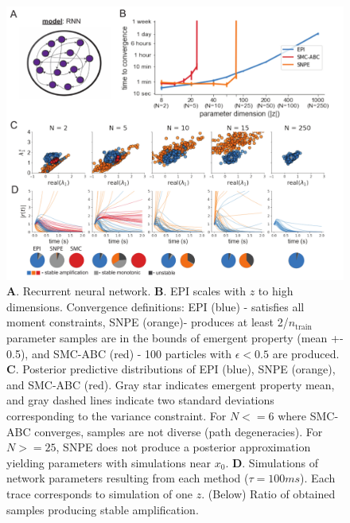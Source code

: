 \documentclass[11pt]{article}
\begin{document}
\begin{figure}
\begin{center}
\includegraphics[scale=.8]{figures/fig4/fig4.pdf}
\end{center}
\caption{\small 
\textbf{A}. Recurrent neural network.
\textbf{B}. EPI scales with $z$ to high dimensions. 
Convergence definitions: 
EPI (blue) - satisfies all moment constraints, 
SNPE (orange)- produces at least 2/$n_{\text{train}}$ parameter samples are in the bounds of emergent property (mean +- 0.5), 
and SMC-ABC (red) - 100 particles with $\epsilon < 0.5$ are produced.
\textbf{C}. Posterior predictive distributions of EPI (blue), SNPE (orange), and SMC-ABC (red). 
Gray star indicates emergent property mean, and gray dashed lines indicate two standard deviations corresponding to the variance constraint.
For $N <= 6$ where SMC-ABC converges, samples are not diverse (path degeneracies).  
For $N >= 25$, SNPE does not produce a posterior approximation yielding parameters with simulations near $x_0$. 
\textbf{D}. Simulations of network parameters resulting from each method ($\tau=100ms$).  Each trace corresponds to simulation of one $z$.  (Below) Ratio of obtained samples producing stable amplification.
}
\label{fig:LRRNN}
\end{figure}
\end{document}
